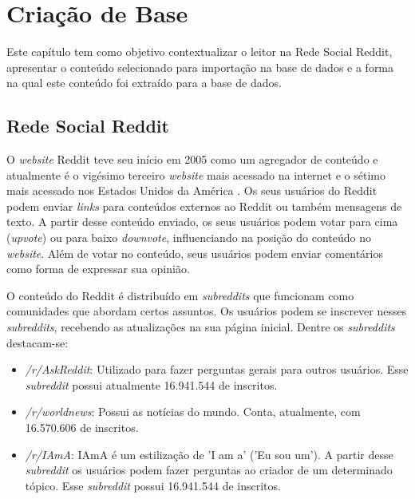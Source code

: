 \chapter{Criação de Base}
\label{cap:banco}
Este capítulo tem como objetivo contextualizar o leitor na Rede Social Reddit,
apresentar o conteúdo selecionado para importação na base de dados e a forma na
qual este conteúdo foi extraído para a base de dados.
\section{Rede Social Reddit}
\label{cap:Reddit}

O \textit{website} Reddit teve seu início em 2005 como um agregador de
conteúdo e atualmente é o vigésimo terceiro \textit{website} mais acessado na
internet e o sétimo mais acessado nos Estados Unidos da América \cite{alexa}.
Os seus usuários do Reddit podem enviar \textit{links} para conteúdos externos
ao Reddit ou também mensagens de texto. A partir desse conteúdo enviado, os seus usuários
podem votar para cima (\textit{upvote}) ou para baixo \textit{downvote},
influenciando na posição do conteúdo no \textit{website}. Além de votar no conteúdo, seus usuários podem enviar comentários como
forma de expressar sua opinião.

O conteúdo do Reddit é distribuído em \textit{subreddits} que funcionam como
comunidades que abordam certos assuntos. Os usuários podem se inscrever nesses
\textit{subreddits}, recebendo as atualizações na sua página inicial. Dentre os
\textit{subreddits} destacam-se:


\begin{itemize}
  \item \textit{/r/AskReddit}: Utilizado para fazer perguntas gerais para
  outros usuários. Esse \textit{subreddit} possui atualmente 16.941.544 de inscritos.
  \item \textit{/r/worldnews}: Possui as notícias do mundo. Conta, atualmente,
  com 16.570.606 de inscritos.
  \item \textit{/r/IAmA}: IAmA é um estilização de 'I am a' ('Eu sou um').
  A partir desse \textit{subreddit} os usuários podem fazer perguntas ao criador
  de um determinado tópico. Esse \textit{subreddit} possui 16.941.544 de
  inscritos.
\end{itemize}

